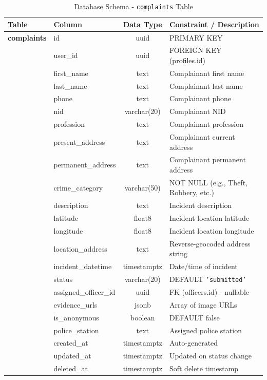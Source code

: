 \documentclass[12pt, a4paper, twoside, openany]{report}
\begin{document}
\begin{table}[ht]
\centering
\caption{Database Schema - \texttt{complaints} Table}
\label{tab:complaints}
\begin{tabularx}{\textwidth}{p{3cm} p{3cm} c X}
\toprule
\textbf{Table} & \textbf{Column} & \textbf{Data Type} & \textbf{Constraint / Description} \\
\midrule
\textbf{complaints} & id & uuid & PRIMARY KEY \\
& user\_id & uuid & FOREIGN KEY (profiles.id) \\
& first\_name & text & Complainant first name \\
& last\_name & text & Complainant last name \\
& phone & text & Complainant phone \\
& nid & varchar(20) & Complainant NID \\
& profession & text & Complainant profession \\
& present\_address & text & Complainant current address \\
& permanent\_address & text & Complainant permanent address \\
& crime\_category & varchar(50) & NOT NULL (e.g., Theft, Robbery, etc.) \\
& description & text & Incident description \\
& latitude & float8 & Incident location latitude \\
& longitude & float8 & Incident location longitude \\
& location\_address & text & Reverse-geocoded address string \\
& incident\_datetime & timestamptz & Date/time of incident \\
& status & varchar(20) & DEFAULT \texttt{'submitted'} \\
& assigned\_officer\_id & uuid & FK (officers.id) - nullable \\
& evidence\_urls & jsonb & Array of image URLs \\
& is\_anonymous & boolean & DEFAULT false \\
& police\_station & text & Assigned police station \\
& created\_at & timestamptz & Auto-generated \\
& updated\_at & timestamptz & Updated on status change \\
& deleted\_at & timestamptz & Soft delete timestamp \\
\bottomrule
\end{tabularx}
\end{table}
\end{document}
